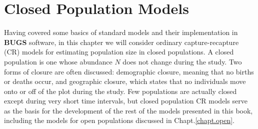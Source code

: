 \chapter{
 Closed Population Models
}
\label{chapt.closed}

\vspace{.3in}

Having covered some basics of standard %
models and their implementation in \textbf{BUGS} software,
in this chapter we will consider ordinary capture-recapture (CR)
models for estimating population size in closed populations. A closed
population is one whose abundance $N$ does not change during the
study. Two forms of closure are often discussed: demographic closure,
meaning that no births or deaths occur, and geographic closure, which
states that no individuals move onto or off of the plot during the study.
Few populations are actually closed except during very short
time intervals, but closed population CR models serve as the basis for
the development of the rest of the models presented in this book,
including the models for open populations discussed in
Chapt.\ref{chapt.open}.

